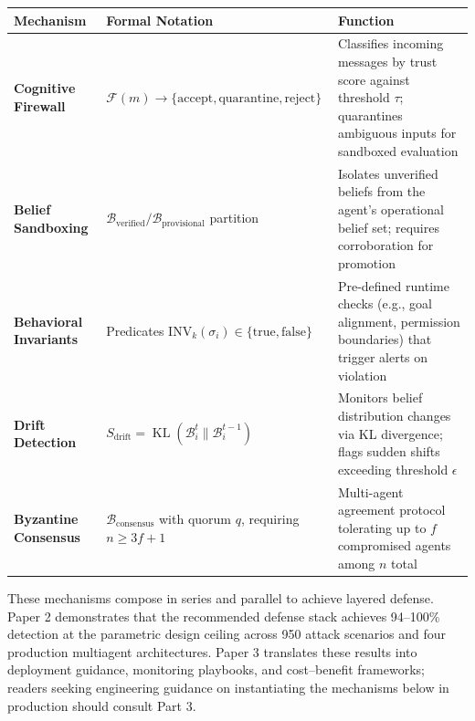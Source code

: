 \documentclass[
]{article}
\newcounter{none} %
\DeclareMathOperator{\KL}{KL}
\begin{document}
{\def\LTcaptype{none} %
\begin{longtable}[]{@{}
  >{\raggedright\arraybackslash}p{}
  >{\raggedright\arraybackslash}p{}
  >{\raggedright\arraybackslash}p{}@{}}
\toprule\noalign{}
\begin{minipage}[b]{\linewidth}\raggedright
Mechanism
\end{minipage} & \begin{minipage}[b]{\linewidth}\raggedright
Formal Notation
\end{minipage} & \begin{minipage}[b]{\linewidth}\raggedright
Function
\end{minipage} \\
\midrule\noalign{}
\endhead
\bottomrule\noalign{}
\endlastfoot
\textbf{Cognitive Firewall} &
\(\mathcal{F}(m) \to \{\text{accept}, \text{quarantine}, \text{reject}\}\)
& Classifies incoming messages by trust score against threshold
\(\tau\); quarantines ambiguous inputs for sandboxed evaluation \\
\textbf{Belief Sandboxing} &
\(\mathcal{B}_{\text{verified}} / \mathcal{B}_{\text{provisional}}\)
partition & Isolates unverified beliefs from the agent's operational
belief set; requires corroboration for promotion \\
\textbf{Behavioral Invariants} & Predicates
\(\text{INV}_k(\sigma_i) \in \{\text{true}, \text{false}\}\) &
Pre-defined runtime checks (e.g., goal alignment, permission boundaries)
that trigger alerts on violation \\
\textbf{Drift Detection} &
\(S_{\text{drift}} = \KL(\mathcal{B}_i^t \| \mathcal{B}_i^{t-1})\) &
Monitors belief distribution changes via KL divergence; flags sudden
shifts exceeding threshold \(\epsilon\) \\
\textbf{Byzantine Consensus} & \(\mathcal{B}_{\text{consensus}}\) with
quorum \(q\), requiring \(n \geq 3f+1\) & Multi-agent agreement protocol
tolerating up to \(f\) compromised agents among \(n\) total \\
\end{longtable}
}

These mechanisms compose in series and parallel to achieve layered
defense. Paper 2 \cite{friedman2026cogsec2} demonstrates that the
recommended defense stack achieves 94--100\% detection at the parametric
design ceiling across 950 attack scenarios and four production
multiagent architectures. Paper 3 \cite{friedman2026cogsec3} translates
these results into deployment guidance, monitoring playbooks, and
cost--benefit frameworks; readers seeking engineering guidance on
instantiating the mechanisms below in production should consult Part 3.
\end{document}
